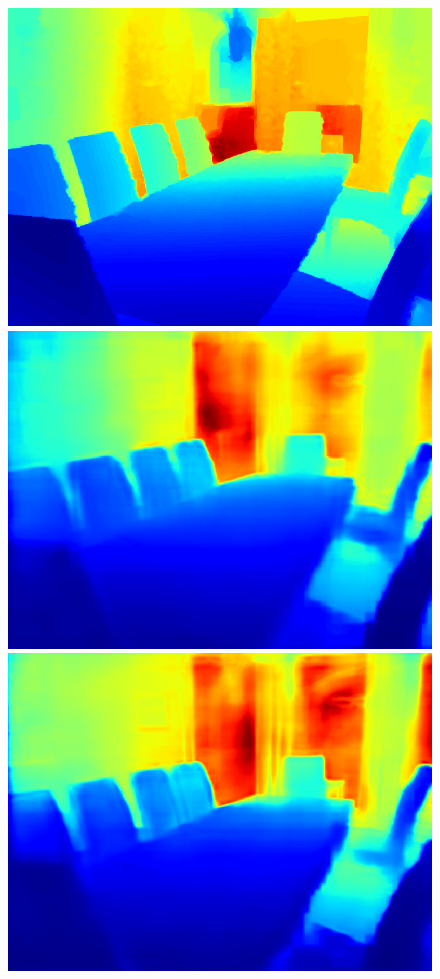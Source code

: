 \documentclass{svjour3}                     %
\begin{document}
\begin{figure}[t]
{\begin{minipage}[t]{0.15\linewidth}
  \includegraphics[width=1\linewidth]{images/nyu_gt/1399.png}
  \includegraphics[width=1\linewidth]{images/nyu_result/dining_room_rgb_01399.png}
  \includegraphics[width=1\linewidth]{images/nyu_without/dining_room_rgb_01399.png}

\end{minipage}}
\end{figure}
\end{document}
